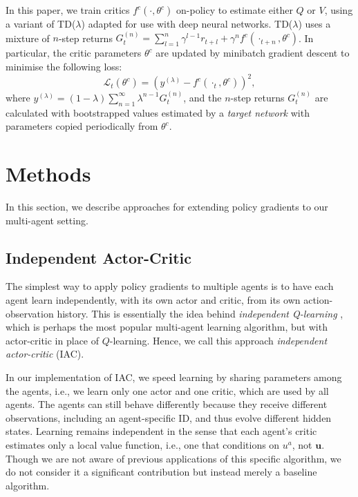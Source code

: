 \documentclass[letterpaper]{article}
\newcommand{\citep}{\cite}
\begin{document}
In this paper, we  train critics $f^c(\cdot,\theta^c)$ on-policy to estimate 
either $Q$ or $V$, using a variant of TD($\lambda$) \citep{sutton1988learning} 
adapted for use with deep neural networks. TD($\lambda$) uses a mixture of 
$n$-step returns $G_t^{(n)} = \sum_{l=1}^{n} \gamma^{l-1}r_{t+l} + \gamma^n 
f^c(\cdot_{t+n}, \theta^c)$. In particular, the critic parameters $\theta^c$ 
are updated by minibatch gradient descent to minimise the following loss:
\begin{equation}
\mathcal{L}_t(\theta^c) = ( y^{(\lambda)} - f^c(\cdot_t, \theta^c))^{2},
\end{equation}
where $y^{(\lambda)} = (1-\lambda)\sum_{n=1}^{\infty} \lambda^{n-1} G_t^{(n)}$, 
and the $n$-step returns $G_t^{(n)}$ are calculated with bootstrapped values 
estimated by a \emph{target network} \citep{mnih2015human} with parameters 
copied periodically from $\theta^c$.

\section{Methods}
\label{sec:methods}

In this section, we describe approaches for extending policy gradients to our multi-agent setting.

\subsection{Independent Actor-Critic}
The simplest way to apply policy gradients to multiple agents is to have each agent learn independently, with its own actor and critic, from its own action-observation history.  This is essentially the idea behind \emph{independent Q-learning} \citep{tan1993multi}, which is perhaps the most popular multi-agent learning algorithm, but with actor-critic in place of $Q$-learning.  Hence, we call this approach \emph{independent actor-critic} (IAC).  

In our implementation of IAC, we speed learning by sharing parameters among the 
agents, i.e., we learn only one actor and one critic, which are used by all 
agents. The agents can still behave differently because they receive different 
observations, including an agent-specific ID, and thus evolve different hidden 
states.  Learning remains independent in the sense that each agent's critic 
estimates only a local value function, i.e., one that conditions on $u^a$, not 
$\mathbf{u}$. Though we are not aware of previous applications of this specific 
algorithm, we do not consider it a significant contribution but instead merely 
a baseline algorithm.
\end{document}
